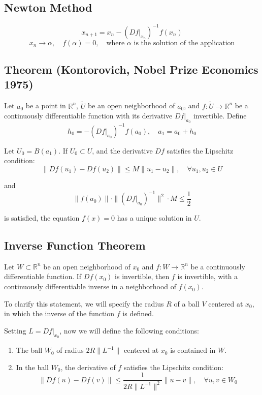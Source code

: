 \documentclass[11pt]{article}
\begin{document}
\subsection{Newton Method}
\[
x_{n+1} = x_n - (Df\big|_{x_n})^{-1} f(x_n)
\]
\[
x_n \rightarrow \alpha, \quad f(\alpha) = 0, \quad \text{where } \alpha \text{ is the solution of the application}
\]

\subsection{Theorem (Kontorovich, Nobel Prize Economics 1975)}
Let $a_0$ be a point in $\mathbb{R}^n$, $\tilde{U}$ be an open neighborhood of $a_0$, and $f : \tilde{U} \rightarrow \mathbb{R}^n$ be a continuously differentiable function with its derivative $Df\big|_{a_0}$ invertible. Define 
\[
h_0 = - (Df\big|_{a_0})^{-1} f(a_0), \quad a_1 = a_0 + h_0
\]

Let $U_0 = B(a_1)$. If $U_0 \subset U$, and the derivative $Df$ satisfies the Lipschitz condition: 
\[
\| Df(u_1) - Df(u_2) \| \leq M \| u_1 - u_2 \|, \quad \forall u_1, u_2 \in U
\]

and
\[
\|f(a_0)\| \cdot \| (Df\big|_{a_0})^{-1} \|^2 \cdot M \leq \frac{1}{2}
\]

is satisfied, the equation $f(x) = 0$ has a unique solution in $U$.

\subsection{Inverse Function Theorem}
Let $W \subset \mathbb{R}^n$ be an open neighborhood of $x_0$ and $f : W \rightarrow \mathbb{R}^n$ be a continuously differentiable function. If $Df(x_0)$ is invertible, then $f$ is invertible, with a continuously differentiable inverse in a neighborhood of $f(x_0)$.

To clarify this statement, we will specify the radius $R$ of a ball $V$ centered at $x_0$, in which the inverse of the function $f$ is defined.

Setting $L = Df\big|_{x_0}$, now we will define the following conditions:
\begin{enumerate}
    \item The ball $W_0$ of radius $2R \| L^{-1} \|$ centered at $x_0$ is contained in $W$.
    \item In the ball $W_0$, the derivative of $f$ satisfies the Lipschitz condition:
    \[
    \|Df(u) - Df(v)\| \leq \frac{1}{2R \|L^{-1}\|^2} \|u - v\|, \quad \forall u,v \in W_0
    \]
\end{enumerate}
\end{document}
